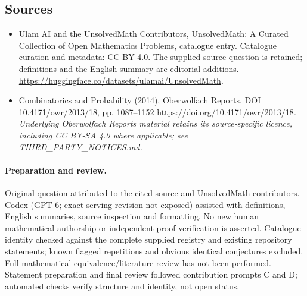 \documentclass[11pt]{article}
\begin{document}
\subsection{Sources}
\begin{itemize}
\item[\hypertarget{source:statement:1}{S1}] Ulam AI and the UnsolvedMath Contributors, UnsolvedMath: A Curated Collection of Open Mathematics Problems, catalogue entry. Catalogue curation and metadata: CC BY 4.0. The supplied source question is retained; definitions and the English summary are editorial additions.
\url{https://huggingface.co/datasets/ulamai/UnsolvedMath}.
\item[\hypertarget{source:statement:2}{S2}] Combinatorics and Probability (2014), Oberwolfach Reports, DOI 10.4171/owr/2013/18, pp. 1087--1152
\url{https://doi.org/10.4171/owr/2013/18}.
\textit{Underlying Oberwolfach Reports material retains its source-specific licence, including CC BY-SA 4.0 where applicable; see THIRD\_PARTY\_NOTICES.md.}
\end{itemize}
\paragraph{Preparation and review.}
Original question attributed to the cited source and UnsolvedMath contributors. Codex (GPT-6; exact serving revision not exposed) assisted with definitions, English summaries, source inspection and formatting. No new human mathematical authorship or independent proof verification is asserted. Catalogue identity checked against the complete supplied registry and existing repository statements; known flagged repetitions and obvious identical conjectures excluded. Full mathematical-equivalence/literature review has not been performed. Statement preparation and final review followed contribution prompts C and D; automated checks verify structure and identity, not open status.
\label{end:statement}
\end{document}
